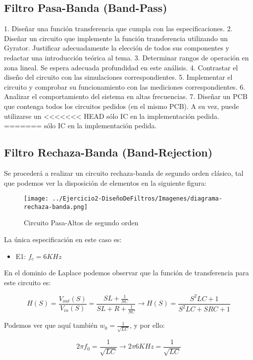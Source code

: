 \subsection{Filtro Pasa-Banda (Band-Pass)}

1. Diseñar una función transferencia que cumpla con las especificaciones.
2. Diseñar un circuito que implemente la función transferencia utilizando un Gyrator. Justificar adecuadamente la elección de todos sus componentes y redactar una introducción teórica al tema.
3. Determinar rangos de operación en zona lineal. Se espera adecuada profundidad en este análisis.
4. Contrastar el diseño del circuito con las simulaciones correspondientes.
5. Implementar el circuito y comprobar su funcionamiento con las mediciones correspondientes.
6. Analizar el comportamiento del sistema en altas frecuencias.
7. Diseñar un PCB que contenga todos los circuitos pedidos (en el mismo PCB). A su vez, puede utilizarse un
<<<<<<< HEAD
sólo IC en la implementación pedida.
=======
sólo IC en la implementación pedida.

\subsection{Filtro Rechaza-Banda (Band-Rejection)}

Se procederá a realizar un circuito rechaza-banda de segundo orden clásico, tal que podemos
ver la disposición de elementos en la siguiente figura:

\begin{figure}[H]
    \centering
    \texttt{[image: ../Ejercicio2-DiseñoDeFiltros/Imagenes/diagrama-rechaza-banda.png]}
    \caption{Circuito Pasa-Altos de segundo orden}
\end{figure}

La única especificación en este caso es:

\begin{itemize}
	\item E1: $f_c=6 KHz$
\end{itemize}

En el dominio de Laplace podemos observar que la función de transferencia para este circuito es:

$$H(S)=\frac{V_{out}(S)}{V_{in}(S)}=\frac{SL+\frac{1}{SC}}{SL+R+\frac{1}{SC}} \longrightarrow H(S)=\frac{S^{2}LC+1}{S^2LC+SRC+1}$$

Podemos ver que aquí también $w_0=\frac{1}{\sqrt{LC}}$, y por ello:

$$2 \pi f_0 = \frac{1}{\sqrt{LC}} \longrightarrow 2 \pi 6KHz = \frac{1}{\sqrt{LC}}$$

